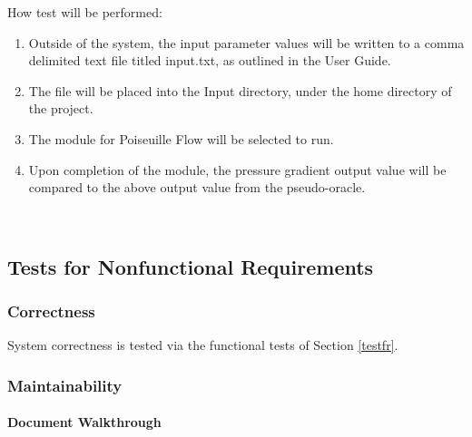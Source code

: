 \documentclass[12pt, titlepage]{article}
\begin{document}
\begin{enumerate}
How test will be performed: 

\begin{enumerate}
\item Outside of the system, the input parameter values will be written to a
comma delimited text file titled input.txt, as outlined in the User Guide.
\item The file will be placed into the Input directory, under the home directory
of the project.
\item The module for Poiseuille Flow will be selected to run.
\item Upon completion of the module, the pressure gradient output value will be
compared to the above output value from the pseudo-oracle.
\end{enumerate}	

\end{enumerate}

~\newpage

\subsection{Tests for Nonfunctional Requirements}
\label{nfrtest}

\subsubsection{Correctness}

System correctness is tested via the functional tests of Section \ref{testfr}.

\subsubsection{Maintainability}
		
\paragraph{Document Walkthrough}
\end{document}
